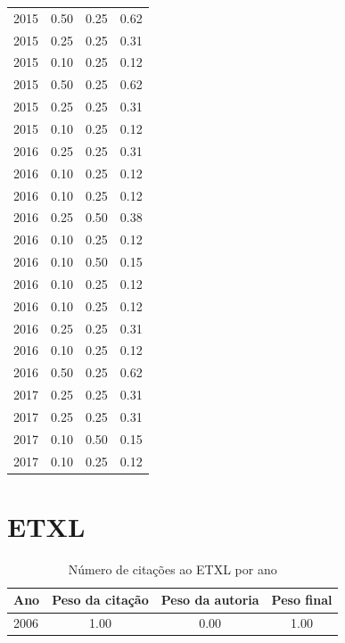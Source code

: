 \begin{table}[H]
\begin{tabular}{| l | c | c | c |}
  2015
    & 0.50
    & 0.25
    & {\color{blue} 0.62} \\
  2015
    & 0.25
    & 0.25
    & {\color{red} 0.31} \\
  2015
    & 0.10
    & 0.25
    & {\color{red} 0.12} \\
  2015
    & 0.50
    & 0.25
    & {\color{blue} 0.62} \\
  2015
    & 0.25
    & 0.25
    & {\color{red} 0.31} \\
  2015
    & 0.10
    & 0.25
    & {\color{red} 0.12} \\
\hline
  2016
    & 0.25
    & 0.25
    & {\color{red} 0.31} \\
  2016
    & 0.10
    & 0.25
    & {\color{red} 0.12} \\
  2016
    & 0.10
    & 0.25
    & {\color{red} 0.12} \\
  2016
    & 0.25
    & 0.50
    & {\color{red} 0.38} \\
  2016
    & 0.10
    & 0.25
    & {\color{red} 0.12} \\
  2016
    & 0.10
    & 0.50
    & {\color{red} 0.15} \\
  2016
    & 0.10
    & 0.25
    & {\color{red} 0.12} \\
  2016
    & 0.10
    & 0.25
    & {\color{red} 0.12} \\
  2016
    & 0.25
    & 0.25
    & {\color{red} 0.31} \\
  2016
    & 0.10
    & 0.25
    & {\color{red} 0.12} \\
  2016
    & 0.50
    & 0.25
    & {\color{blue} 0.62} \\
\hline
  2017
    & 0.25
    & 0.25
    & {\color{red} 0.31} \\
  2017
    & 0.25
    & 0.25
    & {\color{red} 0.31} \\
  2017
    & 0.10
    & 0.50
    & {\color{red} 0.15} \\
  2017
    & 0.10
    & 0.25
    & {\color{red} 0.12} \\
\hline
\end{tabular}
\end{table}
\section{ETXL}
\begin{table}[H]
\caption{Número de citações ao ETXL por ano}
\centering
\begin{tabular}{| l | c | c | c |}
  \hline
  Ano & Peso da citação & Peso da autoria & Peso final \\
  \hline
  2006
    & 1.00
    & 0.00
    & {\color{blue} 1.00} \\
\hline
\end{tabular}
\end{table}
